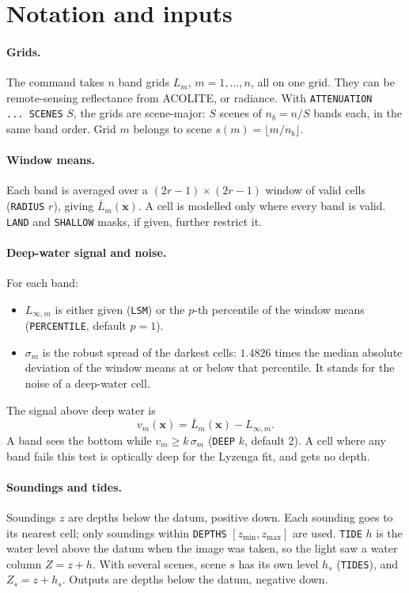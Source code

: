 \documentclass[11pt]{article}
\numberwithin{equation}{section}
\newcommand{\bx}{\mathbf{x}}
\newcommand{\code}[1]{\texttt{#1}}
\newcommand{\Lsm}[1]{L_{\infty,#1}}
\begin{document}
\section{Notation and inputs}
\label{sec:inputs}

\paragraph{Grids.} The command takes $n$ band grids $L_m$, $m = 1,\dots,n$, all on one grid. They
can be remote-sensing reflectance from ACOLITE, or radiance. With \code{ATTENUATION ...\ SCENES}
$S$, the grids are scene-major: $S$ scenes of $n_b = n/S$ bands each, in the same band order.
Grid $m$ belongs to scene $s(m) = \lfloor m/n_b \rfloor$.

\paragraph{Window means.} Each band is averaged over a $(2r-1)\times(2r-1)$ window of valid cells
(\code{RADIUS} $r$), giving $\bar L_m(\bx)$. A cell is modelled only where every band is valid.
\code{LAND} and \code{SHALLOW} masks, if given, further restrict it.

\paragraph{Deep-water signal and noise.} For each band:
\begin{itemize}
\item $\Lsm{m}$ is either given (\code{LSM}) or the $p$-th percentile of the window means
  (\code{PERCENTILE}, default $p = 1$).
\item $\sigma_m$ is the robust spread of the darkest cells: $1.4826$ times the median absolute
  deviation of the window means at or below that percentile. It stands for the noise of a
  deep-water cell.
\end{itemize}
The signal above deep water is
\begin{equation}
  v_m(\bx) = \bar L_m(\bx) - \Lsm{m} .
\end{equation}
A band sees the bottom while $v_m \ge k\,\sigma_m$ (\code{DEEP} $k$, default 2). A cell where any
band fails this test is optically deep for the Lyzenga fit, and gets no depth.

\paragraph{Soundings and tides.} Soundings $z$ are depths below the datum, positive down. Each
sounding goes to its nearest cell; only soundings within \code{DEPTHS} $[z_{\min}, z_{\max}]$
are used. \code{TIDE} $h$ is the water level above the datum when the image was taken, so the
light saw a water column $Z = z + h$. With several scenes, scene $s$ has its own level $h_s$
(\code{TIDES}), and $Z_s = z + h_s$. Outputs are depths below the datum, negative down.
\end{document}

